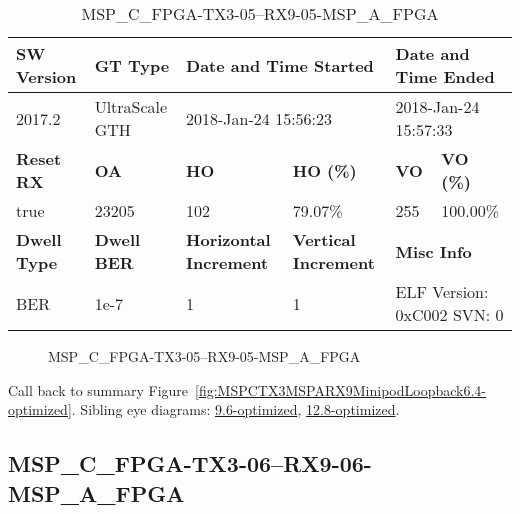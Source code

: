 \begin{table}[h]
\centering
\caption{MSP\_C\_FPGA-TX3-05--RX9-05-MSP\_A\_FPGA}
\label{tab:MSPCFPGATX305RX905MSPAFPGA6.4-optimized}
\begin{tabular}{@{}|l|l|l|l|l|l|@{}}
\toprule
\textbf{SW Version}                & \textbf{GT Type}   & \multicolumn{2}{l|}{\textbf{Date and Time Started}}            & \multicolumn{2}{l|}{\textbf{Date and Time Ended}}        \\ \midrule
2017.2                       & UltraScale GTH          & \multicolumn{2}{l|}{2018-Jan-24 15:56:23}                   & \multicolumn{2}{l|}{2018-Jan-24 15:57:33}               \\ \midrule
\textbf{Reset RX}                  & \textbf{OA} & \textbf{HO}   & \textbf{HO (\%)} & \textbf{VO} & \textbf{VO (\%)} \\ \midrule
true & 23205        & 102          & 79.07\%        & 255        & 100.00\%       \\ \midrule
\textbf{Dwell Type}                & \textbf{Dwell BER} & \textbf{Horizontal Increment} & \textbf{Vertical Increment}    & \multicolumn{2}{l|}{\textbf{Misc Info}}                  \\ \midrule
BER                            & 1e-7        & 1        & 1           & \multicolumn{2}{l|}{ELF Version: 0xC002 SVN: 0}                         \\ \bottomrule
\end{tabular}
\end{table}

\begin{figure}[h]
\caption{MSP\_C\_FPGA-TX3-05--RX9-05-MSP\_A\_FPGA} \label{fig:MSPCFPGATX305RX905MSPAFPGA6.4-optimized}
\end{figure}

Call back to summary Figure~\ref{fig:MSPCTX3MSPARX9MinipodLoopback6.4-optimized}.
Sibling eye diagrams: \hyperref[sec:MSPCFPGATX305RX905MSPAFPGA9.6-optimized]{9.6-optimized}, \hyperref[sec:MSPCFPGATX305RX905MSPAFPGA12.8-optimized]{12.8-optimized}.

\clearpage
\newpage


\subsection{MSP\_C\_FPGA-TX3-06--RX9-06-MSP\_A\_FPGA}\label{sec:MSPCFPGATX306RX906MSPAFPGA6.4-optimized}

